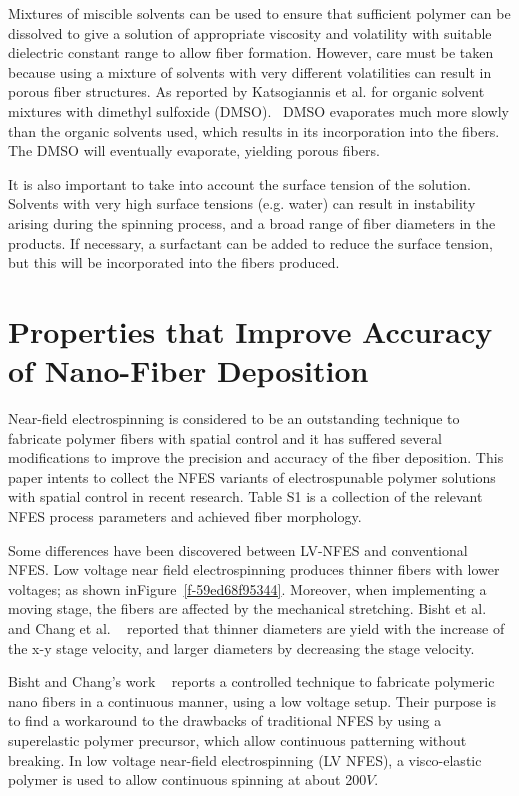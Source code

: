 Mixtures of miscible solvents can be used to ensure that sufficient polymer can be dissolved to give a solution of appropriate viscosity and volatility with suitable dielectric constant range to allow fiber formation. However, care must be taken because using a mixture of solvents with very different volatilities can result in porous fiber structures. As reported by Katsogiannis et al. for organic solvent mixtures with dimethyl sulfoxide (DMSO).\unskip~\cite{527120:13082766} DMSO evaporates much more slowly than the organic solvents used, which results in its incorporation into the fibers. The DMSO will eventually evaporate, yielding porous fibers.

It is also important to take into account the surface tension of the solution. Solvents with very high surface tensions (e.g. water) can result in instability arising during the spinning process, and a broad range of fiber diameters in the products. If necessary, a surfactant can be added to reduce the surface tension, but this will be incorporated into the fibers produced.
    
\section{Properties that Improve Accuracy of Nano-Fiber Deposition}
Near-field electrospinning is considered to be an outstanding technique to fabricate polymer fibers with spatial control and it has suffered several modifications to improve the precision and accuracy of the fiber deposition. This paper intents to collect the NFES variants of electrospunable polymer solutions with spatial control in recent research. Table S1 is a collection of the relevant NFES process parameters and achieved fiber morphology.

Some differences have been discovered between LV-NFES and conventional NFES. Low voltage near field electrospinning produces thinner fibers with lower voltages; as shown inFigure~\ref{f-59ed68f95344}. Moreover, when implementing a moving stage, the fibers are affected by the mechanical stretching. Bisht et al. and Chang et al. \unskip~\cite{527120:11973130,527120:11974313} reported that thinner diameters are yield with the increase of the x-y stage velocity, and larger diameters by decreasing the stage velocity.

Bisht and Chang's work \unskip~\cite{527120:11973130,527120:11974313} reports a controlled technique to fabricate polymeric nano fibers in a continuous manner, using a low voltage setup. Their purpose is to find a workaround to the drawbacks of traditional NFES by using a superelastic polymer precursor, which allow continuous patterning without breaking. In low voltage near-field electrospinning (LV NFES), a visco-elastic polymer is used to allow continuous spinning at about 200$V $.

